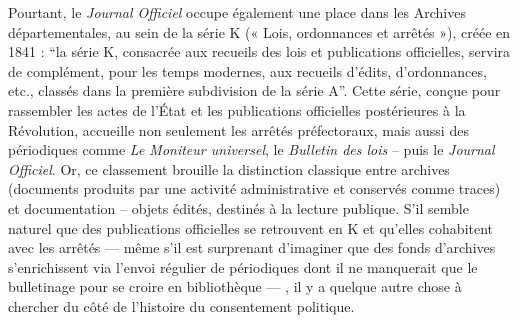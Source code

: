 Pourtant, le \emph{Journal Officiel} occupe également une place dans les Archives départementales, au sein de la série K (« Lois, ordonnances et arrêtés »), créée en 1841 : \enquote{la série K, consacrée aux recueils des lois et publications officielles, servira de complément, pour les temps modernes, aux recueils d’édits, d’ordonnances, etc., classés dans la première subdivision de la série A}. Cette série, conçue pour rassembler les actes de l’État et les publications officielles postérieures à la Révolution, accueille non seulement les arrêtés préfectoraux, mais aussi des périodiques comme \emph{Le Moniteur universel}, le \emph{Bulletin des lois} -- puis le \emph{Journal Officiel}. Or, ce classement brouille la distinction classique entre archives (documents produits par une activité administrative et conservés comme traces) et documentation -- objets édités, destinés à la lecture publique. S’il semble naturel que des publications officielles se retrouvent en K et qu’elles cohabitent avec les arrêtés — même s’il est  surprenant d’imaginer que des fonds d’archives s’enrichissent via  l’envoi régulier de périodiques dont il ne manquerait que le bulletinage pour se croire en bibliothèque — , il y a quelque autre chose à chercher du côté de l’histoire du consentement politique.

